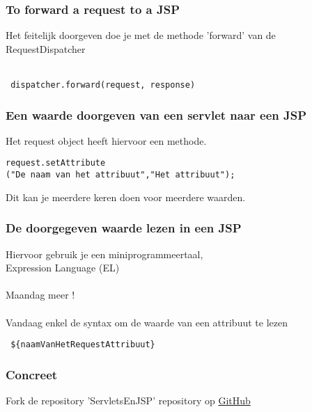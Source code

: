 \documentclass{beamer}
\begin{document}
\begin{frame}[fragile]

\frametitle {To forward a request to a JSP}

{\Large Het feitelijk doorgeven doe je met de methode 'forward' van de RequestDispatcher\\~\\

\begin{verbatim} dispatcher.forward(request, response) \end{verbatim}
}

\end{frame}


\begin{frame}[fragile]

\frametitle {Een waarde doorgeven van een servlet naar een JSP}

{\Large Het request object heeft hiervoor een methode.\\

\begin{verbatim}request.setAttribute
("De naam van het attribuut","Het attribuut");\end{verbatim}

Dit kan je meerdere keren doen voor meerdere waarden.}

\end{frame}


\begin{frame}[fragile]

\frametitle {De doorgegeven waarde lezen in een JSP}

{\Large Hiervoor gebruik je een miniprogrammeertaal, \\Expression Language (EL)\\~\\

Maandag meer !\\~\\

Vandaag enkel de syntax om de waarde van een attribuut te lezen

\begin{verbatim} ${naamVanHetRequestAttribuut} \end{verbatim}

}

\end{frame}


\begin{frame}

\frametitle{Concreet}

{\Large Fork de repository 'ServletsEnJSP' repository op
\href{https://github.com/VanbockryckInstructeur?tab=repositories}{GitHub}}

\end{frame}
\end{document}

